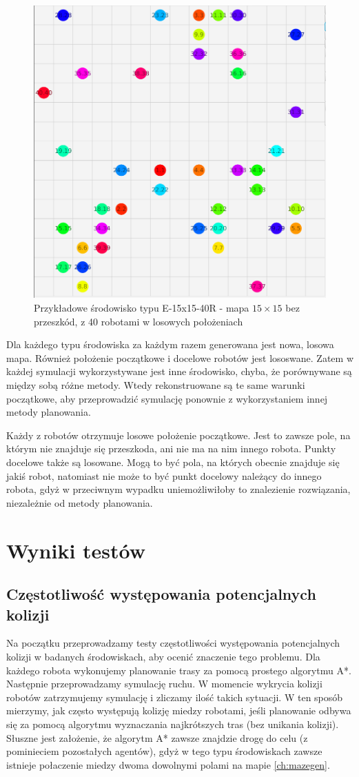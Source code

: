 \begin{figure}
	\centering
	\includegraphics[width=0.6\columnwidth]{img/robopath/tests-15-15-empty-40}
	\caption{Przykładowe środowisko typu E-15x15-40R - mapa $15 \times 15$ bez przeszkód, z 40 robotami w losowych położeniach}
	\label{fig:test-env-15-15-empty-40}
\end{figure}

Dla każdego typu środowiska za każdym razem generowana jest nowa, losowa mapa. Również położenie początkowe i docelowe robotów jest lososwane. Zatem w każdej symulacji wykorzystywane jest inne środowisko, chyba, że porównywane są między sobą różne metody. Wtedy rekonstruowane są te same warunki początkowe, aby przeprowadzić symulację ponownie z wykorzystaniem innej metody planowania.

Każdy z robotów otrzymuje losowe położenie początkowe. Jest to zawsze pole, na którym nie znajduje się przeszkoda, ani nie ma na nim innego robota.
Punkty docelowe także są losowane. Mogą to być pola, na których obecnie znajduje się jakiś robot, natomiast nie może to być punkt docelowy należący do innego robota, gdyż w przeciwnym wypadku uniemożliwiłoby to znalezienie rozwiązania, niezależnie od metody planowania.

\section{Wyniki testów}
\label{ch:test-results}
\subsection{Częstotliwość występowania potencjalnych kolizji} %
Na początku przeprowadzamy testy częstotliwości występowania potencjalnych kolizji w badanych środowiskach, aby ocenić znaczenie tego problemu.
Dla każdego robota wykonujemy planowanie trasy za pomocą prostego algorytmu A*. Następnie przeprowadzamy symulację ruchu. W momencie wykrycia kolizji robotów zatrzymujemy symulację i zliczamy ilość takich sytuacji. W ten sposób mierzymy, jak często występują kolizję miedzy robotami, jeśli planowanie odbywa się za pomocą algorytmu wyznaczania najkrótszych tras (bez unikania kolizji).
Słuszne jest założenie, że algorytm A* zawsze znajdzie drogę do celu (z pominieciem pozostałych agentów), gdyż w tego typu środowiskach zawsze istnieje połaczenie miedzy dwoma dowolnymi polami na mapie \ref{ch:mazegen}.


